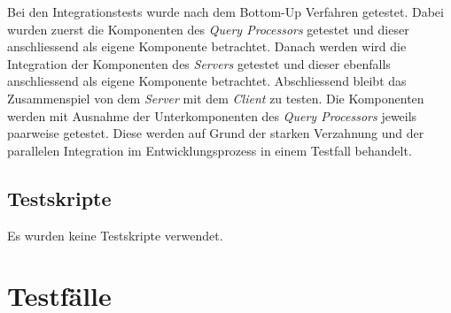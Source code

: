 Bei den Integrationstests wurde nach dem Bottom-Up Verfahren getestet. Dabei wurden zuerst die Komponenten des \textit{Query Processors} getestet und dieser anschliessend als eigene Komponente betrachtet. Danach werden wird die Integration der Komponenten des \textit{Servers} getestet und dieser ebenfalls anschliessend als eigene Komponente betrachtet. Abschliessend bleibt das Zusammenspiel von dem  \textit{Server} mit dem \textit{Client} zu testen.
Die Komponenten werden mit Ausnahme der Unterkomponenten des \textit{Query Processors} jeweils paarweise getestet. Diese werden auf Grund der starken Verzahnung und der parallelen Integration im Entwicklungsprozess in einem Testfall behandelt.

\subsection{Testskripte}
Es wurden keine Testskripte verwendet.

\pagebreak

\section{Testfälle}

